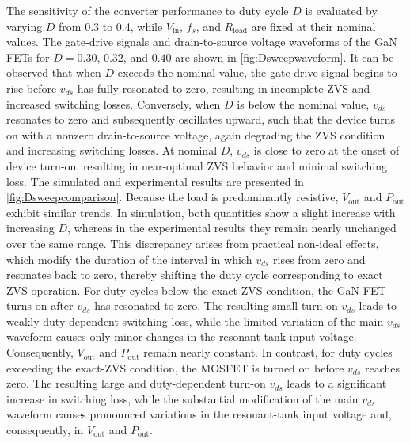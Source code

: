\documentclass[journal, 9pt, letterpaper, english]{IEEEtran}[2015/08/26]
\begin{document}
The sensitivity of the converter performance to duty cycle $D$ is evaluated by varying $D$ from 0.3 to 0.4, while $V_{\mathrm{in}}$, $f_s$, and $R_\mathrm{load}$ are fixed at their nominal values.
The gate-drive signals and drain-to-source voltage waveforms of the GaN FETs for $D = 0.30$, $0.32$, and $0.40$ are shown in \cref{fig:Dsweepwaveform}. It can be observed that when $D$ exceeds the nominal value, the gate-drive signal begins to rise before $v_{ds}$ has fully resonated to zero, resulting in incomplete ZVS and increased switching losses.
Conversely, when $D$ is below the nominal value, $v_{ds}$ resonates to zero and subsequently oscillates upward, such that the device turns on with a nonzero drain-to-source voltage, again degrading the ZVS condition and increasing switching losses.
At nominal $D$, $v_{ds}$ is close to zero at the onset of device turn-on, resulting in near-optimal ZVS behavior and minimal switching loss.
The simulated and experimental results are presented in \cref{fig:Dsweepcomparison}.
Because the load is predominantly resistive, $V_{\mathrm{out}}$ and $P_{\mathrm{out}}$ exhibit similar trends.
In simulation, both quantities show a slight increase with increasing $D$, whereas in the experimental results they remain nearly unchanged over the same range.
This discrepancy arises from practical non-ideal effects, which modify the duration of the interval in which $v_{ds}$ rises from zero and resonates back to zero, thereby shifting the duty cycle corresponding to exact ZVS operation.
For duty cycles below the exact-ZVS condition, the GaN FET turns on after $v_{ds}$ has resonated to zero. The resulting small turn-on $v_{ds}$ leads to weakly duty-dependent switching loss, while the limited variation of the main $v_{ds}$ waveform causes only minor changes in the resonant-tank input voltage.
Consequently, $V_{\mathrm{out}}$ and $P_{\mathrm{out}}$ remain nearly constant.
In contrast, for duty cycles exceeding the exact-ZVS condition, the MOSFET is turned on before $v_{ds}$ reaches zero. The resulting large and duty-dependent turn-on $v_{ds}$ leads to a significant increase in switching loss, while the substantial modification of the main $v_{ds}$ waveform causes pronounced variations in the resonant-tank input voltage and, consequently, in $V_{\mathrm{out}}$ and $P_{\mathrm{out}}$.
\end{document}
